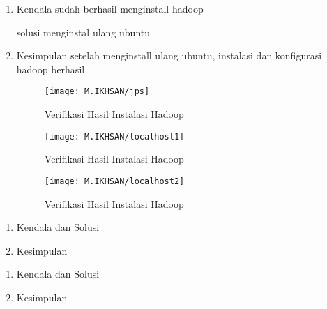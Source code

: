 
\begin{enumerate}
\item Kendala
\newline 
sudah berhasil menginstall hadoop

solusi
menginstal ulang ubuntu

\item Kesimpulan
\newline
setelah menginstall ulang ubuntu, instalasi dan konfigurasi hadoop berhasil

\begin{figure}[!ht]
\texttt{[image: M.IKHSAN/jps]}
\caption{Verifikasi Hasil Instalasi Hadoop}
\label{gam:Java-version(M.IKHSAN)}
\end{figure} 

\begin{figure}[!ht]
\texttt{[image: M.IKHSAN/localhost1]}
\caption{Verifikasi Hasil Instalasi Hadoop}
\label{gam:Java-version(M.IKHSAN)}
\end{figure} 

\begin{figure}[!ht]
\texttt{[image: M.IKHSAN/localhost2]}
\caption{Verifikasi Hasil Instalasi Hadoop}
\label{gam:Hadoop-version(M.IKHSAN)}
\end{figure}

\end{enumerate}


\begin{enumerate}
\item Kendala dan Solusi

\item Kesimpulan

\end{enumerate}

\begin{enumerate}
\item Kendala dan Solusi

\item Kesimpulan

\end{enumerate}


